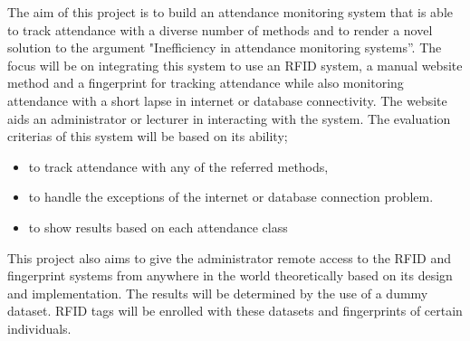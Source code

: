 The aim of this project is to build an attendance monitoring system that is able to track attendance with a diverse number of methods and to render a novel solution to the argument "Inefficiency in attendance monitoring systems”\label{problem}. The focus will be on integrating this system to use an \gls{RFID} system, a manual website method and a fingerprint for tracking attendance while also monitoring attendance with a short lapse in internet or database connectivity. The website aids an administrator or lecturer in interacting with the system. The evaluation criterias of this system will be based on its ability;
\begin{itemize}
 \item to track attendance with any of the referred methods,
 \item to handle the exceptions of the internet or database connection problem.
 \item to show results based on each attendance class
\end{itemize}
This project also aims to give the administrator remote access to the \gls{RFID} and fingerprint systems from anywhere in the world theoretically based on its design and implementation. The results will be determined by the use of a dummy dataset. \gls{RFID} tags will be enrolled with these datasets and fingerprints of certain individuals.
